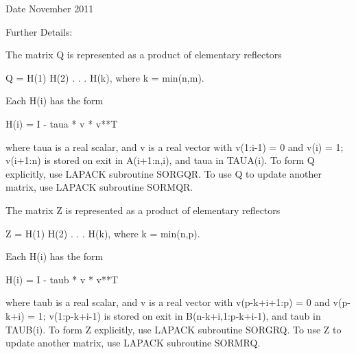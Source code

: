 \begin{DoxyDate}{Date}
November 2011 
\end{DoxyDate}
\begin{DoxyParagraph}{Further Details\+: }
\begin{DoxyVerb}  The matrix Q is represented as a product of elementary reflectors

     Q = H(1) H(2) . . . H(k), where k = min(n,m).

  Each H(i) has the form

     H(i) = I - taua * v * v**T

  where taua is a real scalar, and v is a real vector with
  v(1:i-1) = 0 and v(i) = 1; v(i+1:n) is stored on exit in A(i+1:n,i),
  and taua in TAUA(i).
  To form Q explicitly, use LAPACK subroutine SORGQR.
  To use Q to update another matrix, use LAPACK subroutine SORMQR.

  The matrix Z is represented as a product of elementary reflectors

     Z = H(1) H(2) . . . H(k), where k = min(n,p).

  Each H(i) has the form

     H(i) = I - taub * v * v**T

  where taub is a real scalar, and v is a real vector with
  v(p-k+i+1:p) = 0 and v(p-k+i) = 1; v(1:p-k+i-1) is stored on exit in
  B(n-k+i,1:p-k+i-1), and taub in TAUB(i).
  To form Z explicitly, use LAPACK subroutine SORGRQ.
  To use Z to update another matrix, use LAPACK subroutine SORMRQ.\end{DoxyVerb}
 
\end{DoxyParagraph}
